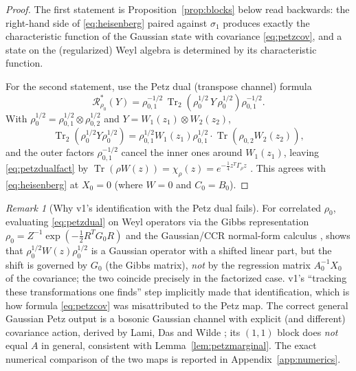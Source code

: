 \documentclass[11pt,a4paper]{article}
\theoremstyle{plain}
\theoremstyle{definition}
\theoremstyle{remark}
\newtheorem{remark}[theorem]{Remark}
\newcommand{\Tr}{\operatorname{Tr}}
\begin{document}
\begin{proof}
The first statement is Proposition~\ref{prop:blocks} below read backwards: the
right-hand side of \eqref{eq:heisenberg} paired against $\sigma_1$ produces
exactly the characteristic function of the Gaussian state with covariance
\eqref{eq:petzcov}, and a state on the (regularized) Weyl algebra is determined
by its characteristic function.

For the second statement, use the Petz dual (transpose channel) formula
\cite{Petz86}
\begin{equation}\label{eq:petzdual}
\mathcal{R}_{\rho_0}^*(Y) = \rho_{0,1}^{-1/2}\,
\Tr_2\!\left(\rho_0^{1/2}\, Y\, \rho_0^{1/2}\right)\rho_{0,1}^{-1/2}.
\end{equation}
With $\rho_0^{1/2} = \rho_{0,1}^{1/2}\otimes\rho_{0,2}^{1/2}$ and
$Y = W_1(z_1)\otimes W_2(z_2)$,
\begin{equation}
\Tr_2\!\left(\rho_0^{1/2} Y \rho_0^{1/2}\right)
= \rho_{0,1}^{1/2} W_1(z_1)\rho_{0,1}^{1/2}\cdot
\Tr\!\left(\rho_{0,2} W_2(z_2)\right),
\end{equation}
and the outer factors $\rho_{0,1}^{-1/2}$ cancel the inner ones around
$W_1(z_1)$, leaving \eqref{eq:petzdualfact} by
$\Tr(\rho W(z)) = \chi_\rho(z) = e^{-\frac{1}{4}z^T\Gamma_\rho z}$
\cite[Prop.~12.8]{Holevo11}. This agrees with \eqref{eq:heisenberg} at $X_0 = 0$
(where $W = 0$ and $C_0 = B_0$).
\end{proof}

\begin{remark}[Why v1's identification with the Petz dual fails]\label{rem:petzgap}
For correlated $\rho_0$, evaluating \eqref{eq:petzdual} on Weyl operators via the
Gibbs representation $\rho_0 = Z^{-1}\exp(-\tfrac{1}{2}R^T G_0 R)$
\cite[Proposition~12.18]{Holevo11} and the Gaussian/CCR normal-form calculus
\cite[Chapter~4]{Folland89}, \cite{Simon94} shows that
$\rho_0^{1/2}W(z)\rho_0^{1/2}$ is a Gaussian operator with a shifted linear part,
but the shift is governed by $G_0$ (the Gibbs matrix), \emph{not} by the
regression matrix $A_0^{-1}X_0$ of the covariance; the two coincide precisely in
the factorized case. v1's ``tracking these transformations one finds'' step
implicitly made that identification, which is how formula \eqref{eq:petzcov} was
misattributed to the Petz map. The correct general Gaussian Petz output is a
bosonic Gaussian channel with explicit (and different) covariance action, derived
by Lami, Das and Wilde \cite{LamiDasWilde18}; its $(1,1)$ block does \emph{not}
equal $A$ in general, consistent with Lemma~\ref{lem:petzmarginal}. The exact
numerical comparison of the two maps is reported in Appendix~\ref{app:numerics}.
\end{remark}
\end{document}
